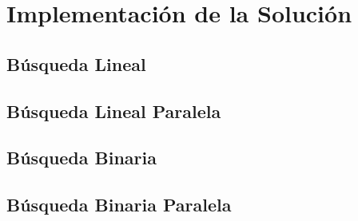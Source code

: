 \documentclass[12pt, fleqn]{article}                             %
\theoremstyle{break}                                            %
\begin{document}
\section{Implementación de la Solución}

    \clearpage
    \subsection{Búsqueda Lineal}

        

    \clearpage
    \subsection{Búsqueda Lineal Paralela}
        

    \clearpage
    \subsection{Búsqueda Binaria}

        

    \clearpage
    \subsection{Búsqueda Binaria Paralela}
        

    \clearpage
\end{document}
